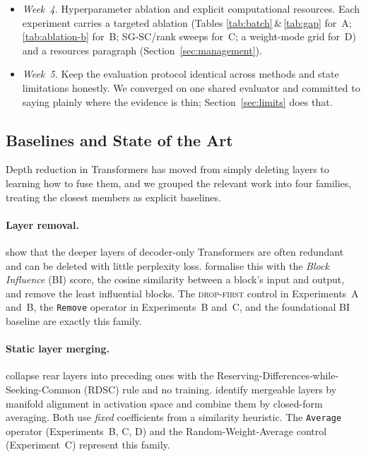 \documentclass[10pt,a4paper]{article}
\newcommand{\dropfirst}{\textsc{drop-first}}
\newcommand{\removeop}{\texttt{Remove}}
\newcommand{\averageop}{\texttt{Average}}
\begin{document}
\begin{itemize}
    trusting results, and isolate selection from test. Experiment~A gained a
    preflight equality check and a disjoint ranking partition; Experiment~B
    runs five structural self-checks on a tiny GPT-2; Experiments~C and~D carve
    calibration/window holdouts and touch the test set once.
  \item \emph{Week~4.} Hyperparameter ablation and explicit computational
    resources. Each experiment carries a targeted ablation (Tables
    \ref{tab:batch}\,\&\,\ref{tab:gap} for~A; \ref{tab:ablation-b} for~B;
    SG-SC/rank sweeps for~C; a weight-mode grid for~D) and a resources
    paragraph (Section~\ref{sec:management}).
  \item \emph{Week~5.} Keep the evaluation protocol identical across methods
    and state limitations honestly. We converged on one shared evaluator and
    committed to saying plainly where the evidence is thin;
    Section~\ref{sec:limits} does that.
\end{itemize}

\subsection{Baselines and State of the Art}
\label{sec:sota}

Depth reduction in Transformers has moved from simply deleting layers to
learning how to fuse them, and we grouped the relevant work into four families,
treating the closest members as explicit baselines.

\paragraph{Layer removal.} \citet{gromov2024unreasonable} show that the deeper
layers of decoder-only Transformers are often redundant and can be deleted with
little perplexity loss. \citet{men2024shortgpt} formalise this with the
\emph{Block Influence} (BI) score, the cosine similarity between a block's input
and output, and remove the least influential blocks. The \dropfirst{} control in
Experiments~A and~B, the \removeop{} operator in Experiments~B and~C, and the
foundational BI baseline are exactly this family.

\paragraph{Static layer merging.} \citet{yang2024laco} collapse rear layers into
preceding ones with the Reserving-Differences-while-Seeking-Common (RDSC) rule
and no training. \citet{liu2024pruning} identify mergeable layers by manifold
alignment in activation space and combine them by closed-form averaging. Both
use \emph{fixed} coefficients from a similarity heuristic. The \averageop{}
operator (Experiments~B, C, D) and the Random-Weight-Average control
(Experiment~C) represent this family.
\end{document}
